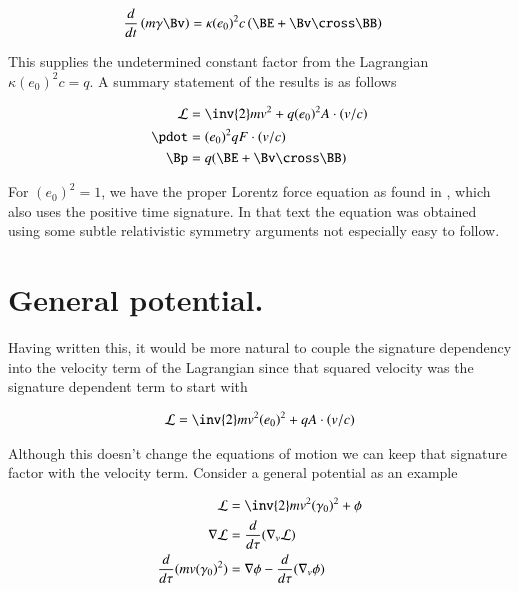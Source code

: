 \begin{align*}
\frac{d}{dt}\left( m \gamma \Bv \right) &= \kappa (e_0)^2 c \left( \BE + \Bv \cross \BB \right)
\end{align*}

This supplies the undetermined constant factor from the Lagrangian $\kappa (e_0)^2 c = q$.  A summary statement of the results is as follows

\begin{align}\label{eqn:lorForce:summarize}
\LL &= \inv{2} m v^2 + q (e_0)^2 A \cdot (v/c) \\
\pdot &= (e_0)^2 q F \cdot (v/c) \\
\Bp &= q (\BE + \Bv \cross \BB)
\end{align}

For $(e_0)^2 = 1$, we have the proper Lorentz force equation as found in
\cite{doran2003gap}, which also uses the positive time signature.  In that text the equation was obtained using some subtle relativistic symmetry arguments not especially easy to follow.

\section{General potential. }

Having written this, it would be more natural to couple the signature dependency into the velocity term of the Lagrangian since that squared velocity was the 
signature dependent term to start with

\begin{align*}
\LL &= \inv{2} m v^2 (e_0)^2 + q A \cdot (v/c) \\
\end{align*}

Although this doesn't change the equations of motion we can keep that signature factor with the velocity term.  Consider a general potential as an example

\begin{align*}
\LL &= \inv{2}m v^2 (\gamma_0)^2 + \phi \\
\grad \LL &= \frac{d}{d\tau}(\grad_v \LL) \\
\frac{d}{d\tau}(m v (\gamma_0)^2) &= \grad \phi - \frac{d}{d\tau}(\grad_v \phi) \\
\end{align*}


%
%
